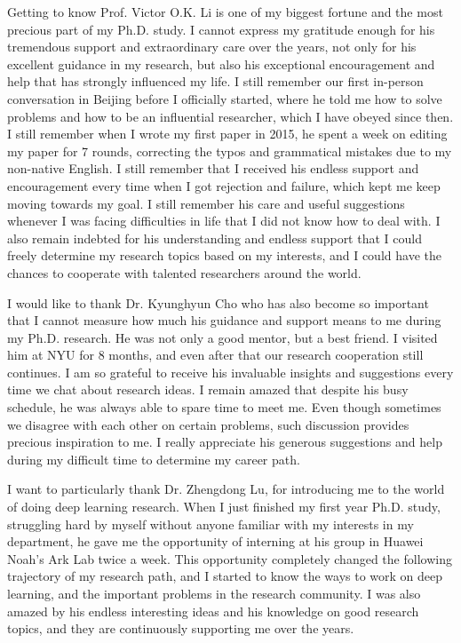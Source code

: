 
Getting to know Prof. Victor O.K. Li is one of my biggest fortune and the most precious part of my Ph.D. study. 
I cannot express my gratitude enough for his tremendous support and extraordinary care over the years, not only for his excellent guidance in my research, but also his exceptional encouragement and help that has strongly influenced my life. 
I still remember our first in-person conversation in Beijing before I officially started, where he told me how to solve problems and how to be an influential researcher, which I have obeyed since then.
I still remember when I wrote my first paper in 2015, he spent a week on editing my paper for 7 rounds, correcting the typos and grammatical mistakes due to my non-native English. 
I still remember that I received his endless support and encouragement every time when I got rejection and failure, which kept me keep moving towards my goal. 
I still remember his care and useful suggestions whenever I was facing difficulties in life that I did not know how to deal with.
I also remain indebted for his understanding and endless support that I could freely determine my research topics based on my interests, and I could have the chances to cooperate with talented researchers around the world.  



 I would like to thank Dr. Kyunghyun Cho who has also become so important that I cannot measure how much his guidance and support means to me during my Ph.D. research.  He was not only a good mentor, but a best friend. I visited him at NYU for 8 months, and even after that our research cooperation still continues. I am so grateful to receive his invaluable insights and suggestions every time we chat about research ideas. 
 I remain amazed that despite his busy schedule, he was always able to spare time to meet me.
 Even though sometimes we disagree with each other on certain problems, such discussion provides precious inspiration to me. 
I really appreciate his generous suggestions and help during my difficult time to determine my career path.
 

 I want to particularly thank Dr. Zhengdong Lu, for introducing me to the world of doing deep learning research. 
 When I just finished my first year Ph.D. study, 
 struggling hard by myself without anyone familiar with my interests in my department, 
 he gave me the opportunity of interning at his group in Huawei Noah's Ark Lab twice a week. 
 This opportunity completely changed the following trajectory of my research path, 
 and I started to know the ways to work on deep learning, 
 and the  important problems in the research community.
 I was also amazed by his endless interesting ideas and his knowledge on good research topics, 
and they are continuously supporting me over the years.

